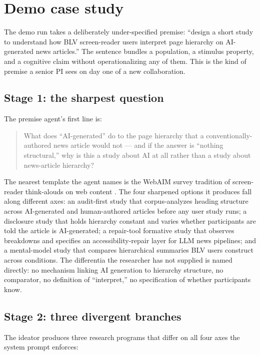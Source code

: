 \section{Demo case study}
\label{sec:demo}

The demo run takes a deliberately under-specified premise: ``design a short study to understand how BLV screen-reader users interpret page hierarchy on AI-generated news articles.'' The sentence bundles a population, a stimulus property, and a cognitive claim without operationalizing any of them. This is the kind of premise a senior PI sees on day one of a new collaboration.

\subsection{Stage 1: the sharpest question}

The premise agent's first line is:

\begin{quote}
What does ``AI-generated'' do to the page hierarchy that a conventionally-authored news article would not --- and if the answer is ``nothing structural,'' why is this a study about AI at all rather than a study about news-article hierarchy?
\end{quote}

The nearest template the agent names is the WebAIM survey tradition of screen-reader think-alouds on web content \citep{webaim2023survey}. The four sharpened options it produces fall along different axes: an audit-first study that corpus-analyzes heading structure across AI-generated and human-authored articles before any user study runs; a disclosure study that holds hierarchy constant and varies whether participants are told the article is AI-generated; a repair-tool formative study that observes breakdowns and specifies an accessibility-repair layer for LLM news pipelines; and a mental-model study that compares hierarchical summaries BLV users construct across conditions. The differentia the researcher has not supplied is named directly: no mechanism linking AI generation to hierarchy structure, no comparator, no definition of ``interpret,'' no specification of whether participants know.

\subsection{Stage 2: three divergent branches}

The ideator produces three research programs that differ on all four axes the system prompt enforces:

